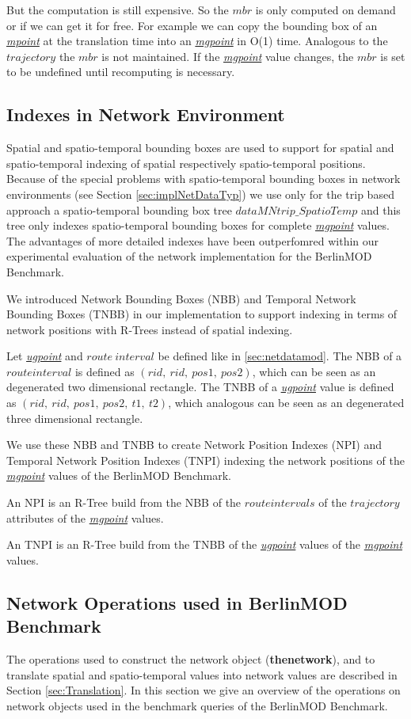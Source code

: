 \documentclass[a4paper]{article}
\newcommand{\bmodb} {BerlinMOD Benchmark}
\newcommand{\op}[1]{\textbf{#1}}
\newcommand{\dt}[1]{\textsl{\underline{#1}}}
\begin{document}
But the computation is still expensive. So the $mbr$ is only computed on demand
or if we can get it for free. For example we can copy
the bounding box of an \dt{mpoint} at the translation time into an \dt{mgpoint}
in O(1) time.
Analogous to the $trajectory$ the $mbr$ is not maintained. If
the \dt{mgpoint} value changes, the $mbr$ is set to be undefined until recomputing
is necessary.

\subsection{Indexes in Network Environment}
\label{sec:implNetIndex}
Spatial and spatio-temporal bounding boxes are used to support for spatial
and spatio-temporal indexing of spatial respectively spatio-temporal positions.
Because of the special problems with spatio-temporal bounding boxes in network
environments (see Section \ref{sec:implNetDataTyp}) we use only for the trip
based approach a spatio-temporal bounding box tree $dataMNtrip\_SpatioTemp$ and
this tree only indexes spatio-temporal bounding boxes for complete \dt{mgpoint}
values. The advantages of more detailed indexes have been outperfomred within
our experimental evaluation of the network implementation for the \bmodb{}.

We introduced Network Bounding Boxes (NBB) and Temporal Network Bounding Boxes
(TNBB) in our implementation to support indexing in terms of network positions
with R-Trees instead of spatial indexing.

Let \dt{ugpoint} and $route\ interval$ be defined like in \ref{sec:netdatamod}.
The NBB of a $route interval$ is defined as $(rid,\ rid,\ pos1,\ pos2)$,
which can be seen as an degenerated two dimensional rectangle.
The TNBB of a \dt{ugpoint} value is defined as
$(rid,\ rid,\ pos1,\ pos2,\ t1,\ t2)$,
which analogous can be seen as an degenerated three dimensional rectangle.

We use these NBB and TNBB to create Network Position Indexes (NPI) and
Temporal Network Position Indexes (TNPI) indexing the network positions of
the \dt{mgpoint} values of the \bmodb{}.

An NPI is an R-Tree build from the NBB
of the $route intervals$ of the $trajectory$ attributes of the \dt{mgpoint}
values.

An TNPI is an R-Tree build from the TNBB of the \dt{ugpoint} values of the
\dt{mgpoint} values.
\subsection{Network Operations used in \bmodb{}}
\label{sec:implNetOperations}
The operations used to construct the network object (\op{thenetwork}), and to
translate spatial and spatio-temporal values into network values are described in
Section \ref{sec:Translation}. In this section we give an overview of the
operations on network objects used in the benchmark queries of the \bmodb{}.
\end{document}
